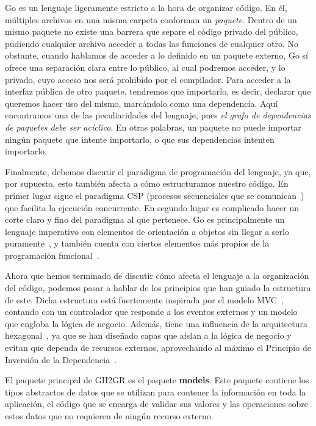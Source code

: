Go es un lenguaje ligeramente estricto a la hora de organizar código. En él, múltiples archivos en una misma carpeta conforman un {\it paquete}. Dentro de un mismo paquete no existe una barrera que separe el código privado del público, pudiendo cualquier archivo acceder a todas las funciones de cualquier otro. No obstante, cuando hablamos de acceder a lo definido en un paquete externo, Go sí ofrece una separación clara entre lo público, al cual podremos acceder, y lo privado, cuyo acceso nos será prohibido por el compilador. Para acceder a la interfaz pública de otro paquete, tendremos que importarlo, es decir, declarar que queremos hacer uso del mismo, marcándolo como una dependencia. Aquí encontramos una de las peculiaridades del lenguaje, pues {\it el grafo de dependencias de paquetes debe ser acíclico}. En otras palabras, un paquete no puede importar ningún paquete que intente importarlo, o que sus dependencias intenten importarlo.

Finalmente, debemos discutir el paradigma de programación del lenguaje, ya que, por supuesto, esto también afecta a cómo estructuramos nuestro código. En primer lugar sigue el paradigma \acrshort{CSP} (procesos secuenciales que se comunican~\cite{hoare1985communicating}) que facilita la ejecución concurrente. En segundo lugar es complicado hacer un corte claro y fino del paradigma al que pertenece. 
Go es principalmente un lenguaje imperativo con elementos de orientación a objetos sin llegar a serlo puramente~\cite{goFAQOOP}, 
y también cuenta con ciertos elementos más propios de la programación funcional~\cite{goCodewalkFirstClass}.

Ahora que hemos terminado de discutir cómo afecta el lenguaje a la organización del código, podemos pasar a hablar de los principios que han guiado la estructura de este. Dicha estructura está fuertemente inspirada por el modelo \acrshort{MVC}~\cite{universitetetiosloTrygveMVC}, contando con un controlador que responde a los eventos externos y un modelo que engloba la lógica de negocio. Además, tiene una influencia de la arquitectura hexagonal~\cite{cockburnHexagonalArchitecture}, ya que se han diseñado capas que aíslan a la lógica de negocio y evitan que dependa de recursos externos, aprovechando al máximo el Principio de Inversión de la Dependencia~\cite{Martin2002-yw}.

El paquete principal de GH2GR es el paquete \textbf{models}. Este paquete contiene los tipos abstractos de datos que se utilizan para contener la información en toda la aplicación, el código que se encarga de validar sus valores y las operaciones sobre estos datos que no requieren de ningún recurso externo.


